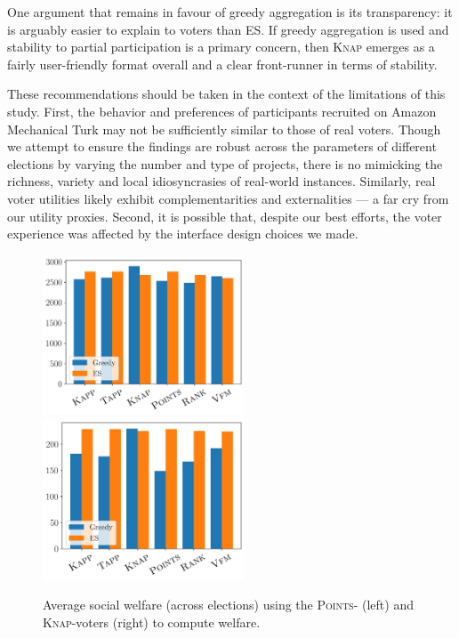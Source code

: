\documentclass{comsoc2023}
\newcommand{\points}{\textsc{Points}}
\newcommand{\knap}{\textsc{Knap}}
\newcommand{\mes}{ES}
\begin{document}
One argument that remains in favour of greedy aggregation is its transparency: it is arguably easier to explain to voters than \mes{}. If greedy aggregation is used    and stability to partial participation is a primary concern, then \knap{} emerges as a fairly user-friendly format overall and a clear front-runner in terms of stability.

These recommendations should be taken in the context of the limitations of this study. First, the  behavior and preferences of participants recruited on Amazon Mechanical Turk may not be sufficiently similar to those of real voters.  Though we attempt to  ensure the findings are robust across the parameters of different elections by varying the number and type of projects, there is no mimicking the richness, variety and local idiosyncrasies of real-world instances. Similarly, real voter utilities likely exhibit complementarities and externalities  --- a far cry from our utility proxies. Second, it is possible that, despite our best efforts, the   voter experience   was affected by the interface design choices we made. 

\begin{figure}[!t]
\begin{center}
\includegraphics[width=6cm]{experiment/Utilities_welfare.png}
\includegraphics[width=6cm]{experiment/Knapsack_welfare.png}

\caption{Average social welfare (across elections) using the \points- (left) and \knap-voters (right) to compute welfare.
}\label{fig:welfare}
\end{center}\vspace{-5mm}
\end{figure}
\end{document}
